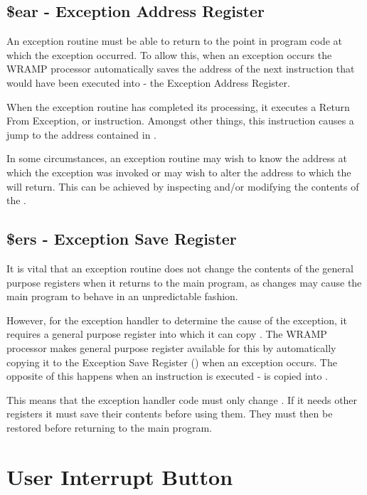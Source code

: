 \subsection{\$ear - Exception Address Register}

An exception routine must be able to return to the point in program code at
which the exception occurred. To allow this, when an exception occurs the
WRAMP processor automatically saves the address of the next instruction
that would have been executed into  - the Exception Address
Register.

When the exception routine has completed its processing, it executes a
Return From Exception, or  instruction. Amongst other things, this
instruction causes a jump to the address contained in .

In some circumstances, an exception routine may wish to know the address at
which the exception was invoked or may wish to alter the address to which
the  will return. This can be achieved by inspecting and/or modifying
the contents of the .

\subsection{\$ers - Exception Save Register}

It is vital that an exception routine does not change the contents of the
general purpose registers when it returns to the main program, as changes
may cause the main program to behave in an unpredictable fashion.

However, for the exception handler to determine the cause of the exception,
it requires a general purpose register into which it can copy
. The WRAMP processor makes general purpose register 
available for this by automatically copying it to the Exception Save
Register () when an exception occurs. The opposite of this happens
when an  instruction is executed -  is copied into
.

This means that the exception handler code must only change . If
it needs other registers it must save their contents before using
them. They must then be restored before returning to the main
program.

\section{User Interrupt Button}

